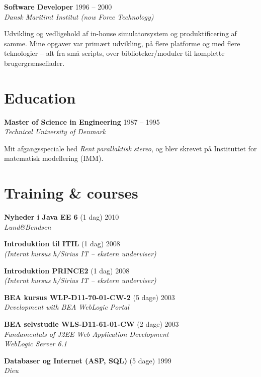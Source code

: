 \documentclass[a4paper,11pt]{article}
\begin{document}
\smallskip

\textbf{Software Developer} \hfill 1996 -- 2000 \\
\textsl{Dansk Maritimt Institut (now Force Technology)}

Udvikling og vedligehold af in-house simulatorsystem og
produktificering af samme. Mine opgaver var primært udvikling, på
flere platforme og med flere teknologier – alt fra små scripts, over
biblioteker/moduler til komplette brugergrænseflader.


\section*{Education}

\textbf{Master of Science in Engineering} \hfill 1987 -- 1995 \\
\textsl{Technical University of Denmark}

Mit afgangsspeciale hed \textit{Rent parallaktisk stereo}, og blev
skrevet på Instituttet for matematisk modellering (IMM).


\section*{Training \& courses}

\textbf{Nyheder i Java EE 6} \hfill (1 dag) 2010 \\
\textsl{Lund\&Bendsen}

\textbf{Introduktion til ITIL} \hfill (1 dag) 2008 \\
\textsl{(Internt kursus h/Sirius IT -- ekstern underviser)}

\textbf{Introduktion PRINCE2} \hfill (1 dag) 2008 \\
\textsl{(Internt kursus h/Sirius IT -- ekstern underviser)}

\textbf{BEA kursus WLP-D11-70-01-CW-2} \hfill (5 dage) 2003 \\
\textsl{Development with BEA WebLogic Portal}

\textbf{BEA selvstudie WLS-D11-61-01-CW} \hfill (2 dage) 2003 \\
\textsl{Fundamentals of J2EE Web Application Development\\WebLogic Server 6.1}


\textbf{Databaser og Internet (ASP, SQL)} \hfill (5 dage) 1999 \\
\textsl{Dieu}
\end{document}
